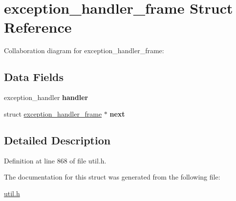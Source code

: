 \hypertarget{structexception__handler__frame}{}\section{exception\+\_\+handler\+\_\+frame Struct Reference}
\label{structexception__handler__frame}


Collaboration diagram for exception\+\_\+handler\+\_\+frame\+:
\subsection*{Data Fields}
\begin{DoxyCompactItemize}
\item 
exception\+\_\+handler {\bfseries handler}\hypertarget{structexception__handler__frame_a9df815cc8cec8aace242043b89fb44e8}{}\label{structexception__handler__frame_a9df815cc8cec8aace242043b89fb44e8}

\item 
struct \hyperlink{structexception__handler__frame}{exception\+\_\+handler\+\_\+frame} $\ast$ {\bfseries next}\hypertarget{structexception__handler__frame_a407cf31d00d01b49b1774dea464c29cf}{}\label{structexception__handler__frame_a407cf31d00d01b49b1774dea464c29cf}

\end{DoxyCompactItemize}


\subsection{Detailed Description}


Definition at line 868 of file util.\+h.



The documentation for this struct was generated from the following file\+:\begin{DoxyCompactItemize}
\item 
\hyperlink{util_8h}{util.\+h}\end{DoxyCompactItemize}
